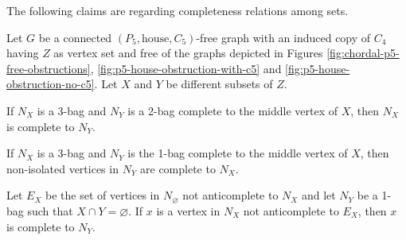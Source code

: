 The following claims are regarding completeness relations among sets.

\begin{lemma}
    Let $G$ be a connected $(P_5,\text{house},C_5)$-free graph with an induced
    copy of $C_4$ having $Z$ as vertex set and free of the graphs depicted in
    Figures \ref{fig:chordal-p5-free-obstructions},
    \ref{fig:p5-house-obstruction-with-c5} and
    \ref{fig:p5-house-obstruction-no-c5}. Let $X$ and $Y$ be different subsets
    of $Z$. 
    \begin{lemenum}
        \item If $N_X$ is a 3-bag and $N_Y$ is a 2-bag complete to the middle
            vertex of $X$, then $N_X$ is complete to $N_Y$. \label{lem:comp_1}
        \item If $N_X$ is a 3-bag and $N_Y$ is the 1-bag complete to the middle
            vertex of $X$, then non-isolated vertices in $N_Y$ are complete to
            $N_X$. \label{lem:type_11}
        \item Let $E_X$ be the set of vertices in $N_\varnothing$ not
            anticomplete to $N_X$ and let $N_Y$ be a 1-bag such that $X\cap Y =
            \varnothing$. If $x$ is a vertex in $N_X$ not anticomplete to $E_X$,
            then $x$ is complete to $N_Y$. \label{lem:type_15}
    \end{lemenum}

\end{lemma}

